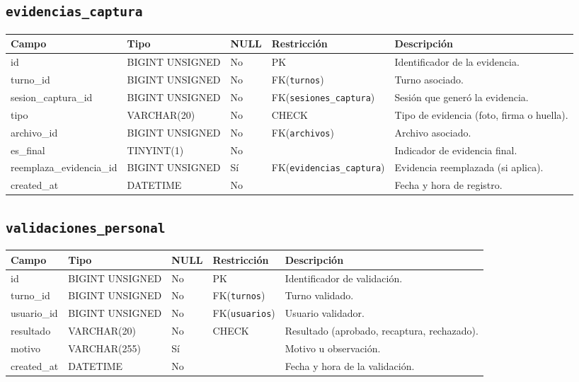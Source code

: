 \documentclass[12pt,a4paper]{article}
\begin{document}
\subsection{\texttt{evidencias\_captura}}
\begin{longtable}{L{3.2cm} L{3.2cm} C{1.2cm} L{2.8cm} L{5.0cm}}
\toprule
\textbf{Campo} & \textbf{Tipo} & \textbf{NULL} & \textbf{Restricción} & \textbf{Descripción} \\
\midrule
\endhead
id & BIGINT UNSIGNED & No & PK & Identificador de la evidencia. \\
turno\_id & BIGINT UNSIGNED & No & FK(\texttt{turnos}) & Turno asociado. \\
sesion\_captura\_id & BIGINT UNSIGNED & No & FK(\texttt{sesiones\_captura}) & Sesión que generó la evidencia. \\
tipo & VARCHAR(20) & No & CHECK & Tipo de evidencia (foto, firma o huella). \\
archivo\_id & BIGINT UNSIGNED & No & FK(\texttt{archivos}) & Archivo asociado. \\
es\_final & TINYINT(1) & No &  & Indicador de evidencia final. \\
reemplaza\_evidencia\_id & BIGINT UNSIGNED & Sí & FK(\texttt{evidencias\_captura}) & Evidencia reemplazada (si aplica). \\
created\_at & DATETIME & No &  & Fecha y hora de registro. \\
\bottomrule
\end{longtable}

\subsection{\texttt{validaciones\_personal}}
\begin{longtable}{L{3.2cm} L{3.2cm} C{1.2cm} L{2.8cm} L{5.0cm}}
\toprule
\textbf{Campo} & \textbf{Tipo} & \textbf{NULL} & \textbf{Restricción} & \textbf{Descripción} \\
\midrule
\endhead
id & BIGINT UNSIGNED & No & PK & Identificador de validación. \\
turno\_id & BIGINT UNSIGNED & No & FK(\texttt{turnos}) & Turno validado. \\
usuario\_id & BIGINT UNSIGNED & No & FK(\texttt{usuarios}) & Usuario validador. \\
resultado & VARCHAR(20) & No & CHECK & Resultado (aprobado, recaptura, rechazado). \\
motivo & VARCHAR(255) & Sí &  & Motivo u observación. \\
created\_at & DATETIME & No &  & Fecha y hora de la validación. \\
\bottomrule
\end{longtable}
\end{document}
